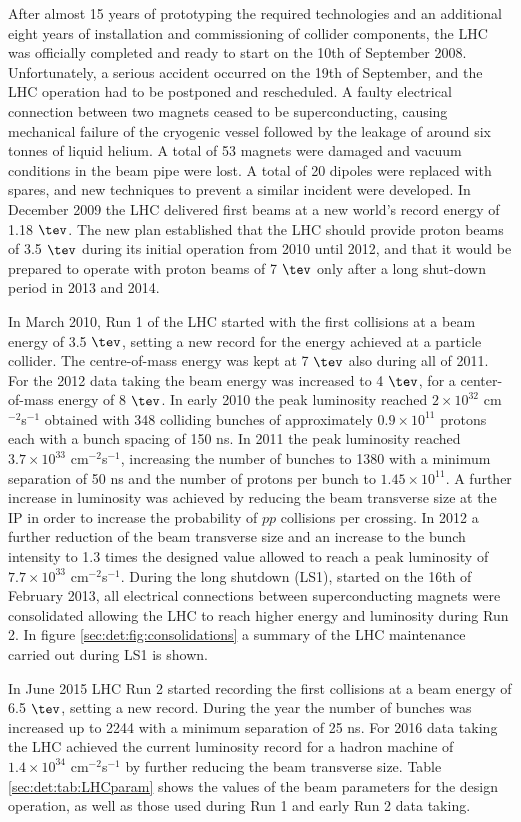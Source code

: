 After almost 15 years of prototyping the required technologies and an additional eight years of installation and commissioning of collider components, the LHC was officially completed and ready to start on the 10th of September 2008. Unfortunately, a serious accident occurred on the 19th of September, and the LHC operation had to be postponed and rescheduled. A faulty electrical connection
between two magnets ceased to be superconducting, causing mechanical failure of the cryogenic vessel followed by the leakage of around six tonnes of liquid helium. A total of 53 magnets were damaged and vacuum conditions in the beam pipe were lost. A total of 20 dipoles were replaced with spares, and new techniques to prevent a similar incident were developed. In December 2009 the LHC delivered first beams at a new world's record energy of 1.18 $\tev$. The new plan established that the LHC should provide proton beams of 3.5 $\tev$ during its initial operation from 2010 until 2012, and that it would be prepared to operate with proton beams of 7 $\tev$ only after a long shut-down period in 2013 and 2014.\par
In March 2010, Run 1 of the LHC started with the first collisions at a beam energy of 3.5 $\tev$, setting a new record for the energy achieved at a particle collider. The centre-of-mass energy was kept at 7 $\tev$ also during all of 2011. For the 2012 data taking the beam energy was increased to 4 $\tev$, for a center-of-mass energy of 8 $\tev$. In early 2010 the peak luminosity reached $2\times10^{32}$ cm$^{-2}$s$^{-1}$ obtained with $348$ colliding bunches of approximately $0.9 \times10^{11}$ protons each with a bunch spacing of 150 ns. In 2011 the peak luminosity reached $3.7\times 10^{33}$ cm$^{-2}$s$^{-1}$, increasing the number of bunches to 1380 with a minimum separation of 50 ns and the number of protons per bunch to $1.45 \times 10^{11}$. A further increase in luminosity was achieved by reducing the beam transverse size at the IP in order to increase the probability of $pp$ collisions per crossing. In 2012  a further reduction of the beam transverse size and an increase to the bunch intensity to 1.3 times the designed value allowed to reach a peak luminosity of $7.7\times10^{33}$ cm$^{-2}$s$^{-1}$. During the long shutdown (LS1), started on the 16th of February 2013, all electrical connections between superconducting magnets were consolidated allowing the LHC to reach higher energy and luminosity during Run 2. In figure \ref{sec:det:fig:consolidations} a summary of the LHC maintenance carried out during LS1 is shown.\par
In June 2015 LHC Run 2 started recording the first collisions at a beam energy of 6.5 $\tev$, setting a new record. During the year the number of bunches was increased up to 2244 with a minimum separation of 25 ns. For 2016 data taking the LHC achieved the current luminosity record for a hadron machine of $1.4 \times 10^{34}$ cm$^{-2}$s$^{-1}$  by further reducing the beam transverse size. Table \ref{sec:det:tab:LHCparam} shows the values of the beam parameters for the design operation, as well as those used during Run 1 and early Run 2 data taking.

